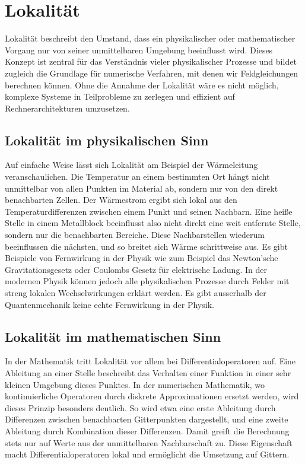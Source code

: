 %
%
%
%
\section{Lokalität
\label{parallelisierung:sec:Lokalitaet}}
Lokalität beschreibt den Umstand, dass ein physikalischer oder mathematischer Vorgang nur von seiner unmittelbaren Umgebung beeinflusst wird. 
Dieses Konzept ist zentral für das Verständnis vieler physikalischer Prozesse und bildet zugleich die Grundlage für numerische Verfahren, mit denen wir Feldgleichungen berechnen können. 
Ohne die Annahme der Lokalität wäre es nicht möglich, komplexe Systeme in Teilprobleme zu zerlegen und effizient auf Rechnerarchitekturen umzusetzen.

\subsection{Lokalität im physikalischen Sinn
	\label{parallelisierung:sub:LokalitaetPhysik}}
Auf einfache Weise lässt sich Lokalität am Beispiel der Wärmeleitung veranschaulichen. 
Die Temperatur an einem bestimmten Ort hängt nicht unmittelbar von allen Punkten im Material ab, sondern nur von den direkt benachbarten Zellen. 
Der Wärmestrom ergibt sich lokal aus den Temperaturdifferenzen zwischen einem Punkt und seinen Nachbarn.
Eine heiße Stelle in einem Metallblock beeinflusst also nicht direkt eine weit entfernte Stelle, sondern nur die benachbarten Bereiche. 
Diese Nachbarstellen wiederum beeinflussen die nächsten, und so breitet sich Wärme schrittweise aus. 
Es gibt Beispiele von Fernwirkung in der Physik wie zum Beispiel das Newton'sche Gravitationsgesetz oder Coulombs Gesetz für elektrische Ladung.
In der modernen Physik können jedoch alle physikalischen Prozesse durch Felder mit streng lokalen Wechselwirkungen erklärt werden.
Es gibt ausserhalb der Quantenmechanik keine echte Fernwirkung in der Physik.

\subsection{Lokalität im mathematischen Sinn
\label{parallelisierung:sub:LokalitaetMathematik}}
In der Mathematik tritt Lokalität vor allem bei Differentialoperatoren auf. 
Eine Ableitung an einer Stelle beschreibt das Verhalten einer Funktion in einer sehr kleinen Umgebung dieses Punktes. 
In der numerischen Mathematik, wo kontinuierliche Operatoren durch diskrete Approximationen ersetzt werden, wird dieses Prinzip besonders deutlich. 
So wird etwa eine erste Ableitung durch Differenzen zwischen benachbarten Gitterpunkten dargestellt, und eine zweite Ableitung durch Kombination dieser Differenzen. 
Damit greift die Berechnung stets nur auf Werte aus der unmittelbaren Nachbarschaft zu. 
Diese Eigenschaft macht Differentialoperatoren lokal und ermöglicht die Umsetzung auf Gittern.

